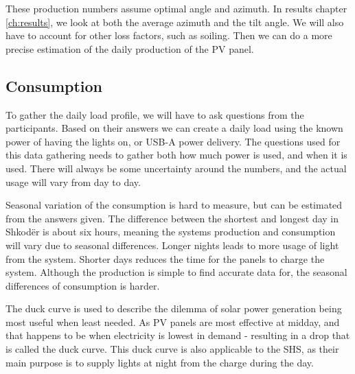 These production numbers assume optimal angle and azimuth. In results chapter \ref{ch:results}, we look at both the average azimuth and the tilt angle. We will also have to account for other loss factors, such as soiling. Then we can do a more precise estimation of the daily production of the PV panel. 


\subsection{Consumption}
To gather the daily load profile, we will have to ask questions from the participants. Based on their answers we can create a daily load using the known power of having the lights on, or USB-A power delivery. The questions used for this data gathering needs to gather both how much power is used, and when it is used. There will always be some uncertainty around the numbers, and the actual usage will vary from day to day. 

Seasonal variation of the consumption is hard to measure, but can be estimated from the answers given. The difference between the shortest and longest day in Shkodër is about six hours\citep{steffenthorsenSunriseSunsetTimes2025}, meaning the systems production and consumption will vary due to seasonal differences. Longer nights leads to more usage of light from the system. Shorter days reduces the time for the panels to charge the system. Although the production is simple to find accurate data for, the seasonal differences of consumption is harder.

The duck curve is used to describe the dilemma of solar power generation being most useful when least needed\citep{krietemeyerManagingDuckCurve2021}. As PV panels are most effective at midday, and that happens to be when electricity is lowest in demand - resulting in a drop that is called the duck curve. This duck curve is also applicable to the SHS, as their main purpose is to supply lights at night from the charge during the day. 

